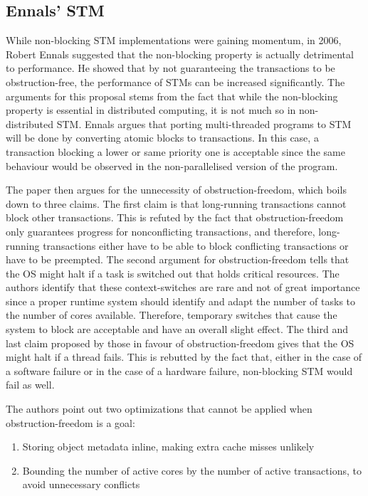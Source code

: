 \subsection{Ennals' STM}
While non-blocking STM implementations were gaining momentum, in 2006, Robert Ennals suggested that the non-blocking property is actually detrimental to performance. He showed that by not guaranteeing the transactions to be obstruction-free, the performance of STMs can be increased significantly\cite{ennals-stm}. The arguments for this proposal stems from the fact that while the non-blocking property is essential in distributed computing, it is not much so in non-distributed STM\cite{ennals-stm}. Ennals argues that porting multi-threaded programs to STM will be done by converting atomic blocks to transactions. In this case, a transaction blocking a lower or same priority one is acceptable since the same behaviour would be observed in the non-parallelised version of the program\cite{ennals-stm}.\par 

The paper then argues for the unnecessity of obstruction-freedom, which boils down to three claims. The first claim is that long-running transactions cannot block other transactions. This is refuted by the fact that obstruction-freedom only guarantees progress for nonconflicting transactions, and therefore, long-running transactions either have to be able to block conflicting transactions or have to be preempted\cite{ennals-stm}. The second argument for obstruction-freedom tells that the OS might halt if a task is switched out that holds critical resources. The authors identify that these context-switches are rare and not of great importance since a proper runtime system should identify and adapt the number of tasks to the number of cores available. Therefore, temporary switches that cause the system to block are acceptable and have an overall slight effect\cite{ennals-stm}. The third and last claim proposed by those in favour of obstruction-freedom gives that the OS might halt if a thread fails. This is rebutted by the fact that, either in the case of a software failure or in the case of a hardware failure, non-blocking STM would fail as well\cite{ennals-stm}.\par 

The authors point out two optimizations that cannot be applied when obstruction-freedom is a goal:

\begin{enumerate}
    \item Storing object metadata inline, making extra cache misses unlikely
    \item Bounding the number of active cores by the number of active transactions, to avoid unnecessary conflicts
\end{enumerate}

